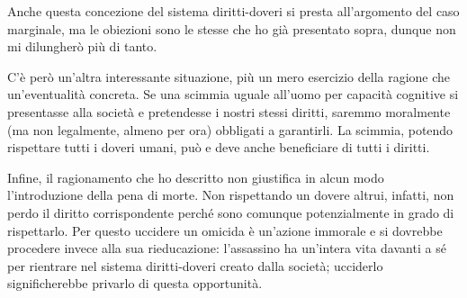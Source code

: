 \documentclass[a4paper,11pt,oneside,article]{memoir}
\begin{document}
Anche questa concezione del sistema diritti-doveri si presta all'argomento del
caso marginale, ma le obiezioni sono le stesse che ho già presentato sopra,
dunque non mi dilungherò più di tanto.

C'è però un'altra interessante situazione, più un mero esercizio della ragione
che un'eventualità concreta. Se una scimmia uguale all'uomo per capacità
cognitive si presentasse alla società e pretendesse i nostri stessi diritti,
saremmo moralmente (ma non legalmente, almeno per ora) obbligati a garantirli.
La scimmia, potendo rispettare tutti i doveri umani, può e deve anche
beneficiare di tutti i diritti.

Infine, il ragionamento che ho descritto non giustifica in alcun modo
l'introduzione della pena di morte. Non rispettando un dovere altrui, infatti,
non perdo il diritto corrispondente perché sono comunque potenzialmente in grado
di rispettarlo. Per questo uccidere un omicida è un'azione immorale e si
dovrebbe procedere invece alla sua rieducazione: l'assassino ha un'intera vita
davanti a sé per rientrare nel sistema diritti-doveri creato dalla società;
ucciderlo significherebbe privarlo di questa opportunità.

\end{document}
